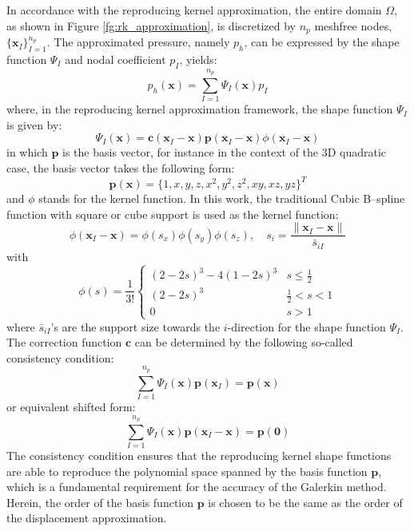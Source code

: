 In accordance with the reproducing kernel approximation, the entire domain $\Omega$, as shown in Figure \ref{fg:rk_approximation}, is discretized by $n_p$ meshfree nodes, $\{\boldsymbol{x}_I\}_{I=1}^{n_p}$. The approximated pressure, namely $p_h$, can be expressed by the shape function $\Psi_I$ and nodal coefficient $p_I$, yields:
\begin{equation}
p_h(\boldsymbol{x}) = \sum_{I=1}^{n_p} \Psi_I(\boldsymbol{x}) p_I
\end{equation}
where, in the reproducing kernel approximation framework, the shape function $\Psi_I$ is given by:
\begin{equation}\label{rkshape}
\Psi_I(\boldsymbol{x}) = \boldsymbol{c}(\boldsymbol{x}_I-\boldsymbol{x}) \boldsymbol{p}(\boldsymbol{x}_I-\boldsymbol{x}) \phi(\boldsymbol{x}_I - \boldsymbol{x})
\end{equation}
in which $\boldsymbol{p}$ is the basis vector, for instance in the context of the 3D quadratic case, the basis vector takes the following form:
\begin{equation}
\boldsymbol{p}(\boldsymbol{x}) = \{ 1, x, y, z, x^2, y^2, z^2, xy, xz, yz\}^T
\end{equation}
and $\phi$ stands for the kernel function. In this work, the traditional Cubic B--spline function with square or cube support is used as the kernel function:
\begin{equation}
\phi(\boldsymbol{x}_I-\boldsymbol{x}) = \phi(s_x) \phi(s_y) \phi(s_z), \quad s_i = \frac{\|\boldsymbol{x}_I - \boldsymbol{x}\|}{\bar{s}_{iI}}
\end{equation}
with
\begin{equation}
\phi(s) = \frac{1}{3!} \begin{cases}
(2-2s)^3 - 4(1-2s)^3 & s\le\frac{1}{2} \\
(2-2s)^3 &\frac{1}{2}<s<1 \\
0 & s> 1
\end{cases}
\end{equation}
where $\bar{s}_{iI}$'s are the support size towards the $i$-direction for the shape function $\Psi_I$. The correction function $\boldsymbol{c}$ can be determined by the following so-called consistency condition:
\begin{equation}\label{cc1}
\sum_{I=1}^{n_p} \Psi_I(\boldsymbol{x}) \boldsymbol{p}(\boldsymbol{x}_I) = \boldsymbol{p} (\boldsymbol{x})
\end{equation}
or equivalent shifted form:
\begin{equation}\label{cc2}
\sum_{I=1}^{n_p} \Psi_I(\boldsymbol{x}) \boldsymbol{p}(\boldsymbol{x}_I-\boldsymbol{x}) = \boldsymbol{p} (\boldsymbol{0})
\end{equation}
The consistency condition ensures that the reproducing kernel shape functions are able to reproduce the polynomial space spanned by the basis function $\boldsymbol{p}$, which is a fundamental requirement for the accuracy of the Galerkin method.
Herein, the order of the basis function $\boldsymbol{p}$ is chosen to be the same as the order of the displacement approximation.

